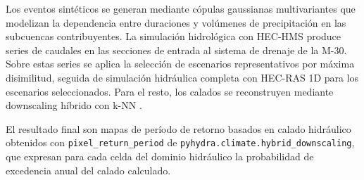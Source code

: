 Los eventos sintéticos se generan mediante cópulas gaussianas multivariantes que modelizan la dependencia entre duraciones y volúmenes de precipitación en las subcuencas contribuyentes. La simulación hidrológica con HEC-HMS produce series de caudales en las secciones de entrada al sistema de drenaje de la M-30. Sobre estas series se aplica la selección de escenarios representativos por máxima disimilitud, seguida de simulación hidráulica completa con HEC-RAS 1D para los escenarios seleccionados. Para el resto, los calados se reconstruyen mediante downscaling híbrido con k-NN \parencite{deljesus2024downscaling}.

El resultado final son mapas de período de retorno basados en calado hidráulico obtenidos con \texttt{pixel\_return\_period} de \texttt{pyhydra.climate.hybrid\_downscaling}, que expresan para cada celda del dominio hidráulico la probabilidad de excedencia anual del calado calculado.

